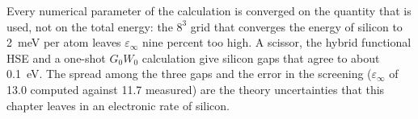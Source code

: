 Every numerical parameter of the calculation is converged on the quantity that is used, not on the total energy: the $8^3$ grid that converges the energy of silicon to \SI{2}{meV} per atom leaves $\varepsilon_\infty$ nine percent too high. A scissor, the hybrid functional HSE and a one-shot $G_0W_0$ calculation give silicon gaps that agree to about \SI{0.1}{eV}. The spread among the three gaps and the error in the screening ($\varepsilon_\infty$ of 13.0 computed against 11.7 measured) are the theory uncertainties that this chapter leaves in an electronic rate of silicon.

\printbibliography[heading=subbibliography]

